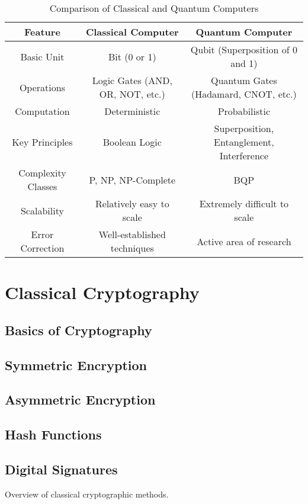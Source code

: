 \documentclass{report}
\begin{document}
\begin{table}[h!]
    \centering
    \begin{tabular}{|c|c|c|}
        \hline
        \textbf{Feature} & \textbf{Classical Computer} & \textbf{Quantum Computer} \\
        \hline
        Basic Unit & Bit (0 or 1) & Qubit (Superposition of 0 and 1) \\
        \hline
        Operations & Logic Gates (AND, OR, NOT, etc.) & Quantum Gates (Hadamard, CNOT, etc.) \\
        \hline
        Computation & Deterministic & Probabilistic \\
        \hline
        Key Principles & Boolean Logic & Superposition, Entanglement, Interference \\
        \hline
        Complexity Classes & P, NP, NP-Complete & BQP \\
         \hline
        Scalability & Relatively easy to scale& Extremely difficult to scale \\
        \hline
        Error Correction & Well-established techniques & Active area of research \\
        \hline

    \end{tabular}
    \caption{Comparison of Classical and Quantum Computers}
    \label{tab:classical-vs-quantum}
\end{table}


\chapter{Classical Cryptography}
\section{Basics of Cryptography}
\section{Symmetric Encryption}
\section{Asymmetric Encryption}
\section{Hash Functions}
\section{Digital Signatures}
Overview of classical cryptographic methods.
\end{document}
